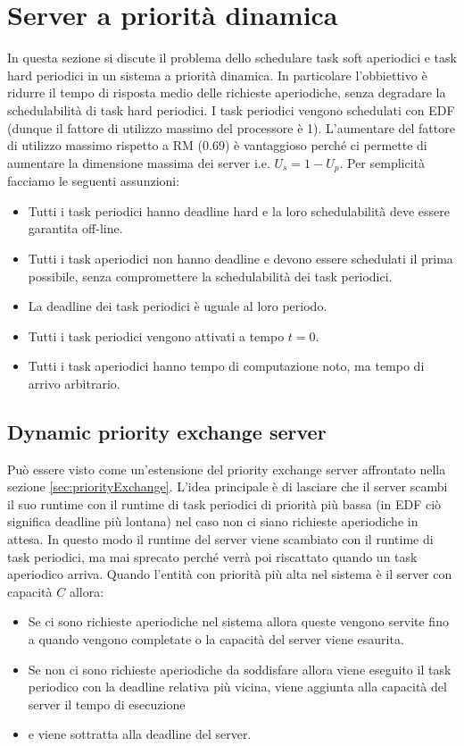 \documentclass[12pt,openany,onesided]{book}
\begin{document}
\chapter{Server a priorità dinamica}
In questa sezione si discute il problema dello schedulare task soft aperiodici e task hard periodici in un sistema a priorità dinamica.
In particolare l'obbiettivo è ridurre il tempo di risposta medio delle richieste aperiodiche, senza degradare la schedulabilità di task hard periodici.
I task periodici vengono schedulati con EDF (dunque il fattore di utilizzo massimo del processore è 1).
L'aumentare del fattore di utilizzo massimo rispetto a RM (0.69) è vantaggioso perché ci permette di aumentare la dimensione massima dei server i.e. $U_s = 1- U_p$.
Per semplicità facciamo le seguenti assunzioni:
\begin{itemize}
\item Tutti i task periodici hanno deadline hard e la loro schedulabilità deve essere garantita off-line.
\item Tutti i task aperiodici non hanno deadline e devono essere schedulati il prima possibile, senza compromettere la schedulabilità dei task periodici.
\item La deadline dei task periodici è uguale al loro periodo.
\item Tutti i task periodici vengono attivati a tempo $t=0$.
\item Tutti i task aperiodici hanno tempo di computazione noto, ma tempo di arrivo arbitrario.
\end{itemize}
\section{Dynamic priority exchange server}
\label{sec:dynamicPriorityExchange}
Può essere visto come un'estensione del priority exchange server affrontato nella sezione \ref{sec:priorityExchange}.
L'idea principale è di lasciare che il server scambi il suo runtime con il runtime di task periodici di priorità più bassa (in EDF ciò significa deadline più lontana) nel caso non ci siano richieste aperiodiche in attesa.
In questo modo il runtime del server viene scambiato con il runtime di task periodici, ma mai sprecato perché verrà poi riscattato quando un task aperiodico arriva.
Quando l'entità con priorità più alta nel sistema è il server con capacità $C$ allora:
\begin{itemize}
    \item Se ci sono richieste aperiodiche nel sistema allora queste vengono servite fino a quando vengono completate o la capacità del server viene esaurita.
    \item Se non ci sono richieste aperiodiche da soddisfare allora viene eseguito il task periodico con la deadline relativa più vicina, viene aggiunta alla capacità del server il tempo di esecuzione 
    \item e viene sottratta alla deadline del server.
\end{itemize}
\end{document}
